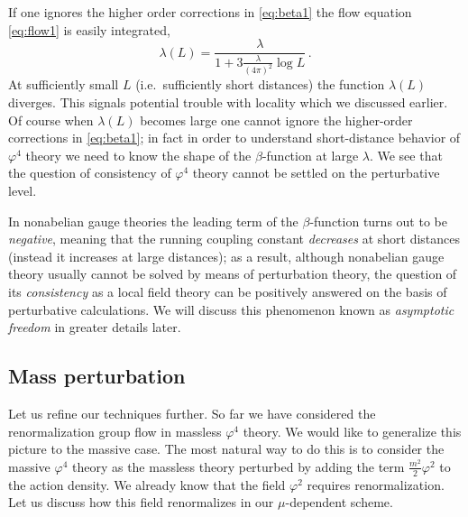If one ignores the higher order corrections in \eqref{eq:beta1} the flow equation
\eqref{eq:flow1} is easily integrated,
\begin{equation}\label{eq:running}
\lambda(L)=\frac\lambda{1+3\frac\lambda{(4\pi)^2}\log L}\,.
\end{equation}
At sufficiently small $L$ (i.e.\ sufficiently short distances) the function
$\lambda(L)$ diverges. This signals potential trouble with locality which we
discussed earlier. Of course when $\lambda(L)$ becomes large one cannot ignore the
higher-order corrections in \eqref{eq:beta1}; in fact in order to understand
short-distance behavior of $\varphi^4$ theory we need to know the shape of the
$\beta$-function at large $\lambda$. We see that the question of consistency of
$\varphi^4$ theory cannot be settled on the perturbative level.

In nonabelian gauge theories the leading term of the $\beta$-function turns out
to be \emph{negative}, meaning that the running coupling constant
\emph{decreases} at short distances (instead it increases at large distances); as
a result, although nonabelian gauge theory usually cannot be solved by means of
perturbation theory, the question of its \emph{consistency} as a local field
theory can be positively answered on the basis of perturbative calculations. We
will discuss this phenomenon known as \emph{asymptotic freedom} in greater details
later.

\subsection*{Mass perturbation}

Let us refine our techniques further. So far we have considered the
renormalization group flow in massless $\varphi^4$ theory. We would like to
generalize this picture to the massive case. The most natural way to do this is
to consider the massive $\varphi^4$ theory as the massless theory perturbed by
adding the term $\frac{m^2}2\varphi^2$ to the action density. We already know that
the field $\varphi^2$ requires renormalization. Let us discuss how this field
renormalizes in our $\mu$-dependent scheme.

